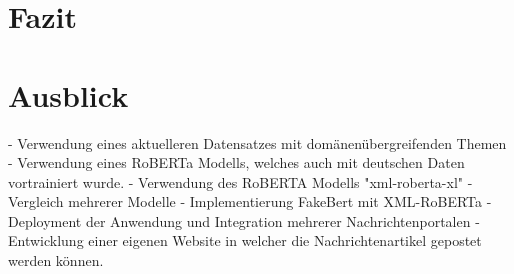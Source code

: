 \chapter{Fazit}
\label{chap:fazit}


\chapter{Ausblick}
\label{chap:ausblick}

- Verwendung eines aktuelleren Datensatzes mit domänenübergreifenden Themen
- Verwendung eines RoBERTa Modells, welches auch mit deutschen Daten vortrainiert wurde.
- Verwendung des RoBERTA Modells "xml-roberta-xl"
- Vergleich mehrerer Modelle
- Implementierung FakeBert mit XML-RoBERTa
- Deployment der Anwendung und Integration mehrerer Nachrichtenportalen
- Entwicklung einer eigenen Website in welcher die Nachrichtenartikel gepostet werden können.
